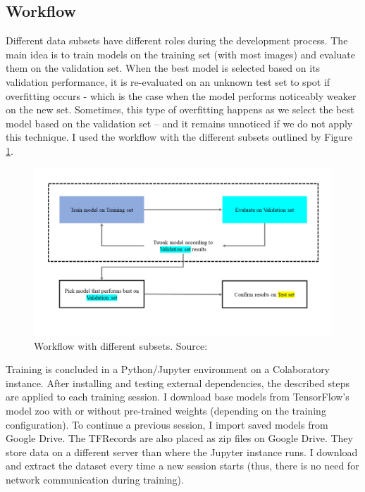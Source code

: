 \subsection{Workflow}

Different data subsets have different roles during the development process. The main idea is to train models on the training set (with most images) and evaluate them on the validation set. When the best model is selected based on its validation performance, it is re-evaluated on an unknown test set to spot if overfitting occurs - which is the case when the model performs noticeably weaker on the new set. Sometimes, this type of overfitting happens as we select the best model based on the validation set – and it remains unnoticed if we do not apply this technique. I used the workflow with the different subsets outlined by Figure \ref{fig:subsets_workflow}.

\begin{figure}[htb]
 \centerline{\includegraphics[width=1.0\columnwidth]{.//Figure/PlateLocalization/subsets_workflow.png}}
 \caption{Workflow with different subsets. Source: \cite{ValidationSet}}
 \label{fig:subsets_workflow}
\end{figure}

Training is concluded in a Python/Jupyter environment on a Colaboratory instance. After installing and testing external dependencies, the described steps are applied to each training session. I download base models from TensorFlow's model zoo with or without pre-trained weights (depending on the training configuration). To continue a previous session, I import saved models from Google Drive. The TFRecords are also placed as zip files on Google Drive. They store data on a different server than where the Jupyter instance runs. I download and extract the dataset every time a new session starts (thus, there is no need for network communication during training).

